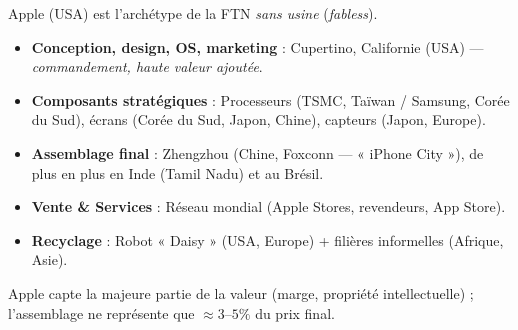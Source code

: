 \documentclass[11pt]{article}
\begin{document}
\begin{exemplebox}
Apple (USA) est l'archétype de la FTN \emph{sans usine} (\emph{fabless}).
\begin{itemize}
    \item \textbf{Conception, design, OS, marketing} : Cupertino, Californie (USA) — \emph{commandement, haute valeur ajoutée}.
    \item \textbf{Composants stratégiques} : Processeurs (TSMC, Taïwan / Samsung, Corée du Sud), écrans (Corée du Sud, Japon, Chine), capteurs (Japon, Europe).
    \item \textbf{Assemblage final} : Zhengzhou (Chine, Foxconn — « iPhone City »), de plus en plus en Inde (Tamil Nadu) et au Brésil.
    \item \textbf{Vente \& Services} : Réseau mondial (Apple Stores, revendeurs, App Store).
    \item \textbf{Recyclage} : Robot « Daisy » (USA, Europe) + filières informelles (Afrique, Asie).
\end{itemize}
Apple capte la majeure partie de la valeur (marge, propriété intellectuelle) ; l'assemblage ne représente que $\approx 3\text{--}5\%$ du prix final.
\end{exemplebox}
\end{document}
